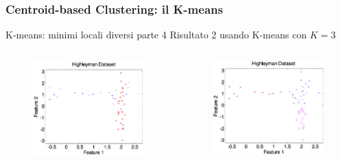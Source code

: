 \begin{frame}

	\frametitle{{\color{GradientDescentDiagramBlue}Centroid-based Clustering}: il K-means}

	\begin{block}{K-means: minimi locali diversi parte 4}
		Risultato 2 usando K-means con $K=3$
		\begin{columns}
			\begin{figure}[!htbp]
				\centering
				\includegraphics[angle=0,width=1\linewidth]{images/unsupervised/kmeans/highley_gt.png}
			\end{figure}

			\begin{figure}[!htbp]
				\centering
				\includegraphics[angle=0,width=1\linewidth]{images/unsupervised/kmeans/highley_3k_2.png}
			\end{figure}


\end{columns}
\end{block}
\end{frame}
